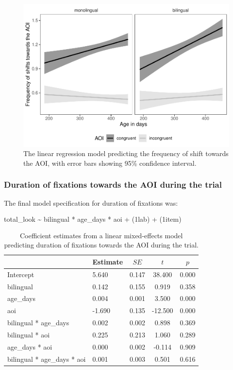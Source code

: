 \documentclass[,man,floatsintext]{apa6}
\begin{document}
\begin{figure}
\centering
\includegraphics{gaze-following-paper_files/figure-latex/fig7-1.pdf}
\caption{\label{fig:fig7}The linear regression model predicting the frequency of shift towards the AOI, with error bars showing 95\% confidence interval.}
\end{figure}

\hypertarget{duration-of-fixations-towards-the-aoi-during-the-trial}{%
\subsubsection{Duration of fixations towards the AOI during the trial}\label{duration-of-fixations-towards-the-aoi-during-the-trial}}

The final model specification for duration of fixations was:

total\_look \textasciitilde{} bilingual * age\_days * aoi +
(1\textbar{}lab) +
(1\textbar{}item)

\begin{table}[tbp]
\begin{center}
\begin{threeparttable}
\caption{\label{tab:coef_table_duration}Coefficient estimates from a linear mixed-effects model predicting duration of fixations towards the AOI during the trial.}
\begin{tabular}{llccc}
\toprule
 & Estimate & $SE$ & $t$ & $p$\\
\midrule
Intercept & 5.640 & 0.147 & 38.400 & 0.000\\
bilingual & 0.142 & 0.155 & 0.919 & 0.358\\
age\_days & 0.004 & 0.001 & 3.500 & 0.000\\
aoi & -1.690 & 0.135 & -12.500 & 0.000\\
bilingual * age\_days & 0.002 & 0.002 & 0.898 & 0.369\\
bilingual * aoi & 0.225 & 0.213 & 1.060 & 0.289\\
age\_days * aoi & 0.000 & 0.002 & -0.114 & 0.909\\
bilingual * age\_days * aoi & 0.001 & 0.003 & 0.501 & 0.616\\
\bottomrule
\end{tabular}
\end{threeparttable}
\end{center}
\end{table}
\end{document}
